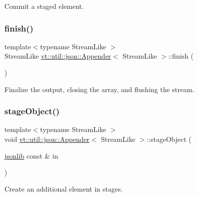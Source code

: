 Commit a staged element. 

\mbox{\label{structvt_1_1util_1_1json_1_1_appender_ab56d332c2a9c5f051d58dbec6803b780}} 
\subsubsection{\texorpdfstring{finish()}{finish()}}
{\footnotesize\ttfamily template$<$typename Stream\+Like $>$ \\
Stream\+Like \hyperlink{structvt_1_1util_1_1json_1_1_appender}{vt\+::util\+::json\+::\+Appender}$<$ Stream\+Like $>$\+::finish (\begin{DoxyParamCaption}{ }\end{DoxyParamCaption})\hspace{0.3cm}{\ttfamily [inline]}}



Finalize the output, closing the array, and flushing the stream. 

\mbox{\label{structvt_1_1util_1_1json_1_1_appender_a8ba476b4b652c43fe6eecbc887c5bb6f}} 
\subsubsection{\texorpdfstring{stage\+Object()}{stageObject()}}
{\footnotesize\ttfamily template$<$typename Stream\+Like $>$ \\
void \hyperlink{structvt_1_1util_1_1json_1_1_appender}{vt\+::util\+::json\+::\+Appender}$<$ Stream\+Like $>$\+::stage\+Object (\begin{DoxyParamCaption}\item[{\hyperlink{structvt_1_1util_1_1json_1_1_appender_aa822e25e24db1cdea96f00b79f55f492}{jsonlib} const \&}]{in }\end{DoxyParamCaption})\hspace{0.3cm}{\ttfamily [inline]}}



Create an additional element in stages. 


